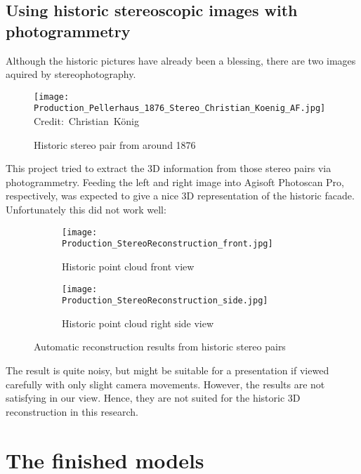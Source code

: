 \subsection{Using historic stereoscopic images with photogrammetry}

Although the historic pictures have already been a blessing, there are two images aquired by stereophotography.


\begin{figure}[h]
	\centering
	\texttt{[image: Production\_Pellerhaus\_1876\_Stereo\_Christian\_Koenig\_AF.jpg]}
	\hbox{\scriptsize Credit: Christian König}
	\caption{Historic stereo pair from around 1876}
	\label{fig:production_stereo_historic}
\end{figure}


This project tried to extract the 3D information from those stereo pairs via photogrammetry. Feeding the left and right image into Agisoft Photoscan Pro, respectively, was expected to give a nice 3D representation of the historic facade. Unfortunately this did not work well:

\begin{figure}[h]
	\centering
	\begin{subfigure}[b]{0.45\textwidth}
		\centering
		\texttt{[image: Production\_StereoReconstruction\_front.jpg]}
		\caption{Historic point cloud front view}
		\label{fig:production_historic_stereo_reconstruction_front}
	\end{subfigure}
	\hfill
	\begin{subfigure}[b]{0.45\textwidth}
		\centering
		\texttt{[image: Production\_StereoReconstruction\_side.jpg]}
		\caption{Historic point cloud right side view}
		\label{fig:production_historic_stereo_reconstruction_side}
	\end{subfigure}
	\caption{Automatic reconstruction results from historic stereo pairs}
	\label{fig:production_historic_stereo_reconstruction}
\end{figure}

The result is quite noisy, but might be suitable for a presentation if viewed carefully with only slight camera movements. However, the results are not satisfying in our view. Hence, they are not suited for the historic 3D reconstruction in this research.

\pagebreak

\section{The finished models}

